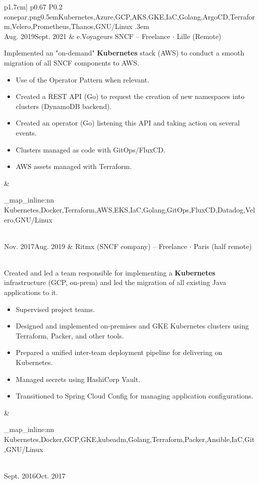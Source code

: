 \documentclass[darkhipster]{hipstercv}
\newcommand{\cvtags}[1] {
	\clist_map_inline:nn { #1 }
	{
		\cvtag{##1} %
	}
}
\newcommand{\cveventdetailed}[9]{
	{\small #1} & 
	{#2 $\cdot$ \small{{#4 ~\faMapMarker}}}\vspace{.5em}\newline
	{\color{black!70}\footnotesize #5\vspace{#9}} &
	{\raisebox{-0.7\height}{\texttt{[image: \#6]}}} \vspace{#7}
	{\par \small \cvtags{#8}}
}
\begin{document}
\begin{longtable}{p{1.7cm}| p{} P{0.2\textwidth}}
{		}
		{sonepar.png}{0.5em}{Kubernetes,Azure,GCP,AKS,GKE,IaC,Golang,ArgoCD,Terraform,Velero,Prometheus,Thanos,GNU/Linux}
		{.3em} \\
	\cveventdetailed
		{Aug. 2019\newline Sept. 2021}
		{e.Voyageurs SNCF -- Freelance}
		{SRE/Architect}
		{Lille (Remote)\color{cvred}}
		{
			Implemented an "on-demand" {\bfseries Kubernetes} stack (AWS) to conduct a smooth migration of all SNCF components to AWS.
			\begin{itemize}
				\item Use of the Operator Pattern when relevant.
				\item Created a REST API (Go) to request the creation of new namespaces into clusters (DynamoDB backend).
				\item Created an operator (Go) listening this API and taking action on several events.
				\item Clusters managed as code with GitOps/FluxCD.
				\item AWS assets managed with Terraform.
			\end{itemize}
		}
		{evoy.png}{0.3em}{Kubernetes,Docker,Terraform,AWS,EKS,IaC,Golang,GitOps,FluxCD,Datadog,Velero,GNU/Linux}
		{.7em} \\
	\cveventdetailed
		{Nov. 2017\newline Aug. 2019}
		{Ritmx (SNCF company) -- Freelance}
		{SRE/Architect}
		{Paris (half remote)\color{cvred}}
		{
			Created and led a team responsible for implementing a {\bfseries Kubernetes} infrastructure (GCP, on-prem) and led the migration of all existing Java applications to it.
			\begin{itemize}
				\item Supervised project teams.
				\item Designed and implemented on-premises and GKE Kubernetes clusters using Terraform, Packer, and other tools.
				\item Prepared a unified inter-team deployment pipeline for delivering on Kubernetes.
				\item Managed secrets using HashiCorp Vault.
				\item Transitioned to Spring Cloud Config for managing application configurations.
			\end{itemize}
		}
		{ritmx.png}{1.1em}{Kubernetes,Docker,GCP,GKE,kubeadm,Golang,Terraform,Packer,Ansible,IaC,Git,GNU/Linux}
		{.7em} \\
	\cveventdetailed
		{Sept. 2016\newline Oct. 2017}

\end{longtable}
\end{document}
